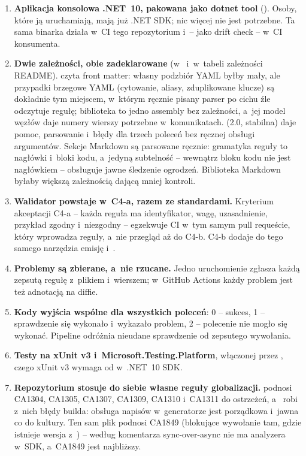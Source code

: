 \begin{enumerate}
  \item \textbf{Aplikacja konsolowa .NET~10, pakowana jako dotnet tool}
        (). Osoby, które ją uruchamiają, mają już .NET SDK;
        nic więcej nie jest potrzebne. Ta sama binarka działa w~CI tego repozytorium i~--
        jako drift check -- w~CI konsumenta.
  \item \textbf{Dwie zależności, obie zadeklarowane} (w~
        i~w~tabeli zależności README).  czyta front matter: własny
        podzbiór YAML byłby mały, ale przypadki brzegowe YAML (cytowanie, aliasy, zduplikowane
        klucze) są dokładnie tym miejscem, w~którym ręcznie pisany parser po cichu źle
        odczytuje regułę; biblioteka to jedno assembly bez zależności, a~jej model węzłów daje
        numery wierszy potrzebne w~komunikatach.  (2.0, stabilna)
        daje pomoc, parsowanie i~błędy dla trzech poleceń bez ręcznej obsługi argumentów.
        Sekcje Markdown są parsowane ręcznie: gramatyka reguły to nagłówki i~bloki kodu,
        a~jedyną subtelność --  wewnątrz bloku kodu nie jest nagłówkiem
        -- obsługuje jawne śledzenie ogrodzeń. Biblioteka Markdown byłaby większą zależnością
        dającą mniej kontroli.
  \item \textbf{Walidator powstaje w~C4-a, razem ze standardami.} Kryterium akceptacji
        C4-a -- każda reguła ma identyfikator, wagę, uzasadnienie, przykład zgodny i~niezgodny
        -- egzekwuje CI w~tym samym pull requeście, który wprowadza reguły, a~nie przegląd aż
        do C4-b. C4-b dodaje do tego samego narzędzia emisję i~.
  \item \textbf{Problemy są zbierane, a~nie rzucane.} Jedno uruchomienie zgłasza każdą
        zepsutą regułę z~plikiem i~wierszem; w~GitHub Actions każdy problem jest też adnotacją
        na diffie.
  \item \textbf{Kody wyjścia wspólne dla wszystkich poleceń}: 0 -- sukces, 1 -- sprawdzenie
        się wykonało i~wykazało problem, 2 -- polecenie nie mogło się wykonać. Pipeline
        odróżnia nieudane sprawdzenie od zepsutego wywołania.
  \item \textbf{Testy na xUnit v3 i~Microsoft.Testing.Platform}, włączonej przez
        , czego xUnit v3 wymaga od  w~.NET~10 SDK.
  \item \textbf{Repozytorium stosuje do siebie własne reguły globalizacji.}
         podnosi CA1304, CA1305, CA1307, CA1309, CA1310 i~CA1311 do
        ostrzeżeń, a~ robi z~nich błędy builda: obsługa
        napisów w~generatorze jest porządkowa i~jawna co do kultury. Ten sam plik podnosi
        CA1849 (blokujące wywołanie tam, gdzie istnieje wersja z~) -- według
        komentarza sync-over-async nie ma analyzera w~SDK, a~CA1849 jest najbliższy.
\end{enumerate}


